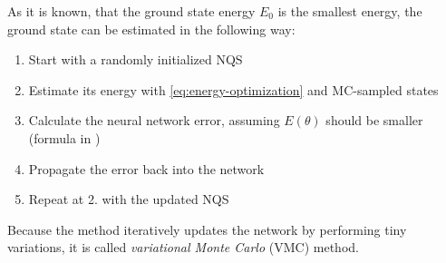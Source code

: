 As it is known, that the ground state energy $E_0$ is the smallest energy, the ground state can be estimated in the following way:
\begin{enumerate}
    \setlength\itemsep{-0.5em}
    \item Start with a randomly initialized NQS
    \item Estimate its energy with \autoref{eq:energy-optimization} and MC-sampled states
    \item Calculate the neural network error, assuming $E(\theta)$ should be smaller (formula in \cite{jVMCPaper})
    \item Propagate the error back into the network
    \item Repeat at 2. with the updated NQS
\end{enumerate}

Because the method iteratively updates the network by performing tiny variations, it is called \emph{variational Monte Carlo} (VMC) method.

